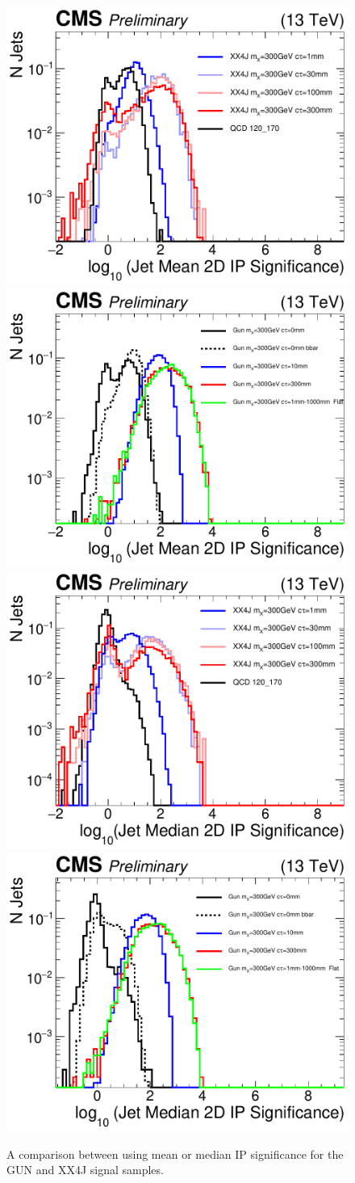 \begin{figure}
\begin{center}
\includegraphics[width=.45\textwidth]{figures/an_jetid/VTX_MATCH_IP/XX4J_log_jetMeanIPSig2D}
\includegraphics[width=.45\textwidth]{figures/an_jetid/VTX_MATCH_IP/GUN_log_jetMeanIPSig2D}
\includegraphics[width=.45\textwidth]{figures/an_jetid/VTX_MATCH_IP/XX4J_log_jetMedianIPSig2D}
\includegraphics[width=.45\textwidth]{figures/an_jetid/VTX_MATCH_IP/GUN_log_jetMedianIPSig2D}
\end{center}
\caption{A comparison between using mean or median IP significance for the GUN and XX4J signal samples.}
\label{fig:ipsig_mean_median}
\end{figure}
